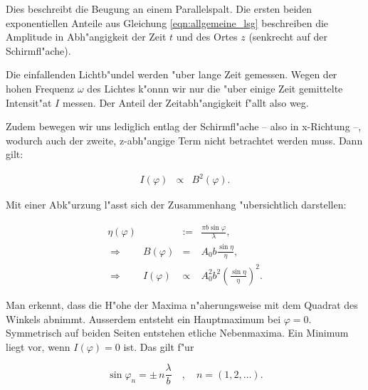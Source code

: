 		Dies beschreibt die Beugung an einem Parallelspalt.
		Die ersten beiden exponentiellen Anteile aus Gleichung \eqref{eqn:allgemeine_lsg} beschreiben die Amplitude in Abh"angigkeit der Zeit $t$ und des Ortes $z$ (senkrecht auf der Schirmfl"ache).

		Die einfallenden Lichtb"undel werden "uber lange Zeit gemessen.
		Wegen der hohen Frequenz $\omega$ des Lichtes k"onnn wir nur die "uber einige Zeit gemittelte Intensit"at $I$ messen. Der Anteil der Zeitabh"angigkeit f"allt also weg.

		Zudem bewegen wir uns lediglich entlag der Schirmfl"ache -- also in x-Richtung --, wodurch auch der zweite, z-abh"angige Term nicht betrachtet werden muss.
		Dann gilt:

		\begin{eqnarray}
			I(\varphi) & \propto & B^2(\varphi) 
		 . \nonumber
		\end{eqnarray}

		Mit einer Abk"urzung l"asst sich der Zusammenhang "ubersichtlich darstellen:

		\begin{eqnarray}
			\eta(\varphi) & := & \frac{\pi b \sin{\varphi}}{\lambda} , \nonumber \\
			\Rightarrow \qquad
			B(\varphi) & = & A_0 b \frac{\sin{\eta}}{\eta} , \label{amplitude_einfach} \\
			\Rightarrow \qquad
			I(\varphi) & \propto & A_0^2 b^2 \left(\frac{\sin{\eta}}{\eta}\right)^2  .
			\label{prop_einzelspalt}
		\end{eqnarray}

		Man erkennt, dass die H"ohe der Maxima n"aherungsweise mit dem Quadrat des Winkels abnimmt.
		Ausserdem entsteht ein Hauptmaximum bei $\varphi = 0$. Symmetrisch auf beiden Seiten entstehen etliche Nebenmaxima.
		Ein Minimum liegt vor, wenn $I(\varphi) = 0$ ist. Das gilt f"ur

		\begin{equation}
			\sin{\varphi_n} = \pm \, n \frac{\lambda}{b} \quad , \quad n = \left(1, 2, \dots\right) .
		\end{equation}

